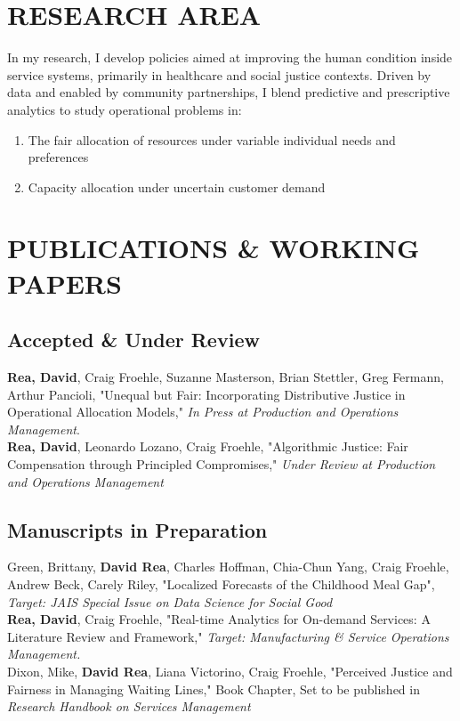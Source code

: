 \documentclass[12pt, letter]{moderncv}
\begin{document}
\smallskip
\section{RESEARCH AREA}
\smallskip
In my research, I develop policies aimed at improving the human condition inside service systems, primarily in healthcare and social justice contexts. Driven by data and enabled by community partnerships, I blend predictive and prescriptive analytics to study operational problems in$:$
\smallskip 
\begin{enumerate}[\hspace{0.5cm}(1)]
	\item The fair allocation of resources under variable individual needs and preferences
	\item Capacity allocation under uncertain customer demand
\end{enumerate}

\smallskip
\section{PUBLICATIONS \& WORKING PAPERS}
\smallskip
\subsection{Accepted \& Under Review}
\smallskip
\textbf{Rea, David}, Craig Froehle, Suzanne Masterson, Brian Stettler, Greg Fermann, Arthur Pancioli, "Unequal but Fair: Incorporating Distributive Justice in Operational Allocation Models," \textit{In Press at Production and Operations Management}.
\medskip\\ 
\textbf{Rea, David}, Leonardo Lozano, Craig Froehle,  "Algorithmic Justice: Fair Compensation through Principled Compromises," \textit{Under Review at Production and Operations Management}
\subsection{Manuscripts in Preparation}
Green, Brittany, \textbf{David Rea}, Charles Hoffman, Chia-Chun Yang, Craig Froehle, Andrew Beck, Carely Riley, "Localized Forecasts of the Childhood Meal Gap", \textit{Target: JAIS Special Issue on Data Science for Social Good}
\medskip \\
%
\textbf{Rea, David}, Craig Froehle, "Real-time Analytics for On-demand Services: A Literature Review and Framework," \textit{Target: Manufacturing \& Service Operations Management.}
\medskip\\
Dixon, Mike, \textbf{David Rea}, Liana Victorino, Craig Froehle, "Perceived Justice and Fairness in Managing Waiting Lines," Book Chapter, Set to be published in \textit{Research Handbook on Services Management}
\end{document}
